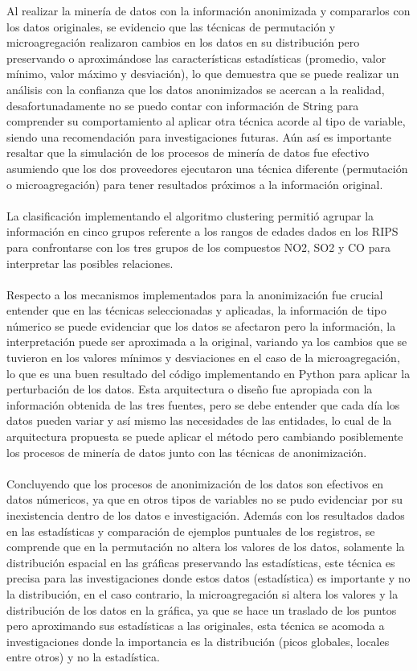 \documentclass[a4paper,openright,12pt]{book}
\theoremstyle{definition}
\theoremstyle{remark}
\begin{document}
Al realizar la minería de datos con la información anonimizada y compararlos con los datos originales, se evidencio que las técnicas de permutación y microagregación realizaron cambios en los datos en su distribución pero preservando o aproximándose las características estadísticas (promedio, valor mínimo, valor máximo y desviación), lo que demuestra que se puede realizar un análisis con la confianza que los datos anonimizados se acercan a la realidad, desafortunadamente no se puedo contar con información de String para comprender su comportamiento al aplicar otra técnica acorde al tipo de variable, siendo una recomendación para investigaciones futuras. Aún así es importante resaltar que la simulación de los procesos de minería de datos fue efectivo asumiendo que los dos proveedores ejecutaron una técnica diferente (permutación o microagregación) para tener resultados próximos a la información original.\\\\  La clasificación implementando el algoritmo clustering permitió agrupar la información en cinco grupos referente a los rangos de edades dados en los RIPS para confrontarse con los tres grupos de los compuestos NO2, SO2 y CO para interpretar las posibles relaciones.\\\\Respecto a los mecanismos implementados para la anonimización fue crucial entender que en las técnicas seleccionadas y aplicadas, la información de tipo númerico se puede evidenciar que los datos se afectaron pero la información, la interpretación puede ser aproximada a la original, variando ya los cambios que se tuvieron en los valores mínimos y desviaciones en el caso de la microagregación, lo que es una buen resultado del código implementando en Python para aplicar la perturbación de los datos. Esta arquitectura o diseño fue apropiada con la información obtenida de las tres fuentes, pero se debe entender que cada día los datos pueden variar y así mismo las necesidades de las entidades,  lo cual de la arquitectura propuesta se puede aplicar el método pero cambiando posiblemente los procesos de minería de datos junto con las técnicas de anonimización.\\\\Concluyendo que los procesos de anonimización de los datos son efectivos en datos númericos, ya que en otros tipos de variables no se pudo evidenciar por su inexistencia dentro de los datos e investigación. Además con los resultados dados en las estadísticas y comparación de ejemplos puntuales de los registros, se comprende que en la permutación no altera los valores de los datos, solamente la distribución espacial en las gráficas preservando las estadísticas, este técnica es precisa para las investigaciones donde estos datos (estadística) es importante y no la distribución, en el caso contrario, la microagregación si altera los valores  y la distribución de los datos en la gráfica, ya que se hace un traslado de los puntos pero aproximando sus estadísticas a las originales, esta técnica se acomoda a investigaciones donde la importancia es la distribución (picos globales, locales entre otros) y no la estadística.
\end{document}
